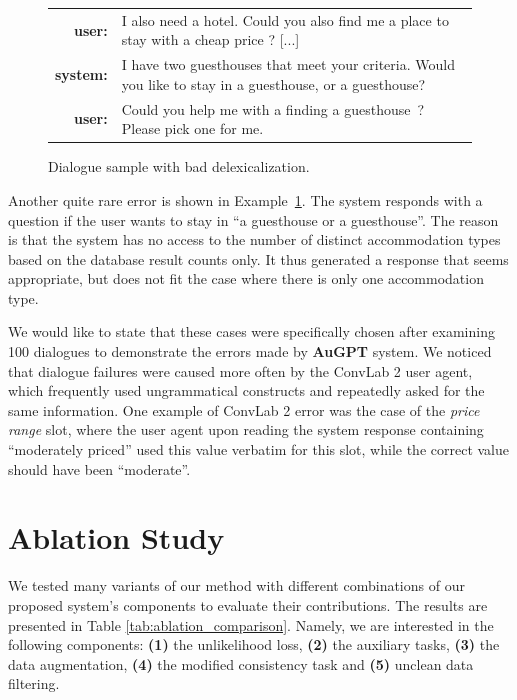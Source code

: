 \documentclass[letterpaper]{article} %
\newcommand{\exampleref}[1]{Example~\ref{#1}}
\newenvironment{example}{\begin{figure}[!ht]}{\end{figure}}
\newcommand{\exampleref}[1]{Figure~\ref{#1}}
\begin{document}
\begin{example}
\setlength{\tabcolsep}{2pt}
\begin{mdframed}[style=ExampleFrame]
\begin{tabularx}{\textwidth}{rX}
\textbf{user:} & I also need a hotel. Could you also find me a place to stay with a cheap price ? [...] \\
\textbf{system:} & I have two guesthouses that meet your criteria. Would you like to stay in a guesthouse, or a guesthouse? \\
\textbf{user:} & Could you help me with a finding a guesthouse~? Please pick one for me. \\
\end{tabularx}
\end{mdframed}
\caption{Dialogue sample with bad delexicalization.\label{ex:error2}}
\end{example}

Another quite rare error is shown in \exampleref{ex:error2}. The system responds with a question if the user wants to stay in ``a guesthouse or a guesthouse''. The reason is that the system has no access to the number of distinct accommodation types based on the database result counts only. It thus generated a response that seems appropriate, but does not fit the case where there is only one accommodation type.

We would like to state that these cases were specifically chosen after examining 100 dialogues to demonstrate the errors made by \textbf{AuGPT} system. We noticed that dialogue failures were caused more often by the ConvLab 2 user agent, which frequently used ungrammatical constructs and repeatedly asked for the same information.
One example of ConvLab 2 error was the case of the \textit{price range} slot, where the user agent upon reading the system response containing ``moderately priced'' used this value verbatim for this slot, while the correct value should have been ``moderate''.



\section{Ablation Study}
We tested many variants of our method with different combinations of our proposed system's components to evaluate their contributions. The results are presented in Table \ref{tab:ablation_comparison}.
Namely, we are interested in the following components:
\textbf{(1)} the unlikelihood loss, \textbf{(2)} the auxiliary tasks, \textbf{(3)} the data augmentation, \textbf{(4)} the modified consistency task and \textbf{(5)} unclean data filtering.
\end{document}
